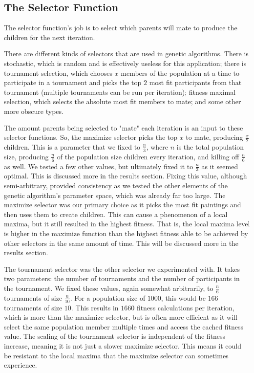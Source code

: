 \subsection{The Selector Function}
The selector function's job is to select which parents will mate to produce the children for the next iteration.

There are different kinds of selectors that are used in genetic algorithms. There is stochastic, which is random and is effectively useless for this application; there is tournament selection, which chooses $x$ members of the population at a time to participate in a tournament and picks the top $2$ most fit participants from that tournament (multiple tournaments can be run per iteration); fitness maximal selection, which selects the absolute most fit members to mate; and some other more obscure types.


The amount parents being selected to "mate" each iteration is an input to these selector functions. So, the maximize selector picks the top $x$ to mate, producing $\frac{x}{2}$ children. This is a parameter that we fixed to $\frac{n}{3}$, where $n$ is the total population size, producing $\frac{n}{6}$ of the population size children every iteration, and killing off $\frac{n}{6}$ as well. We tested a few other values, but ultimately fixed it to $\frac{n}{3}$ as it seemed optimal. This is discussed more in the results section. Fixing this value, although semi-arbitrary, provided consistency as we tested the other elements of the genetic algorithm's parameter space, which was already far too large. The maximize selector was our primary choice as it picks the most fit paintings and then uses them to create children. This can cause a phenomenon of a local maxima, but it still resulted in the highest fitness. That is, the local maxima level is higher in the maximize function than the highest fitness able to be achieved by other selectors in the same amount of time. This will be discussed more in the results section.

The tournament selector was the other selector we experimented with. It takes two parameters: the number of tournaments and the number of participants in the tournament. We fixed these values, again somewhat arbitrarily, to $\frac{n}{6}$ tournaments of size $\frac{n}{10}$. For a population size of $1000$, this would be $166$ tournaments of size $10$. This results in $1660$ fitness calculations per iteration, which is more than the maximize selector, but is often more efficient as it will select the same population member multiple times and access the cached fitness value. The scaling of the tournament selector is independent of the fitness increase, meaning it is not just a slower maximize selector.\cite{selectors} This means it could be resistant to the local maxima that the maximize selector can sometimes experience.



